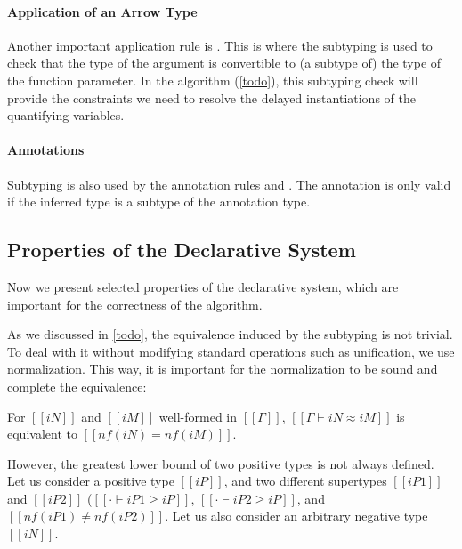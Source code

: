 \paragraph{Application of an Arrow Type}
  Another important application rule is .
  This is where the subtyping is used to check that the type of the argument
  is convertible to (a subtype of) the type of the function parameter.
  In the algorithm (\cref{todo}), this subtyping check will provide the constraints
  we need to resolve the delayed instantiations of the quantifying variables.

\paragraph{Annotations}
  Subtyping is also used by the annotation rules 
  and . The annotation is only valid if the
  inferred type is a subtype of the annotation type.


\subsection{Properties of the Declarative System}

Now we present selected properties of the declarative system,
which are important for the correctness of the algorithm.

As we discussed in \cref{todo}, the equivalence induced by the subtyping is 
not trivial. To deal with it without modifying standard operations such as unification, 
we use normalization. This way, it is important for the normalization to be 
sound and complete \wrt the equivalence:

\begin{property}
  For $[[iN]]$ and $[[iM]]$ well-formed in $[[Γ]]$,
  $[[Γ ⊢ iN ≈ iM]]$ is equivalent to $[[nf(iN) = nf(iM)]]$.
\end{property}

However, the greatest lower bound of two positive types is not always defined.
Let us consider a positive type $[[iP]]$,
and two different supertypes $[[iP1]]$ and $[[iP2]]$
(\ie  $[[· ⊢ iP1 ≥ iP]]$, $[[· ⊢ iP2 ≥ iP]]$, and $[[nf(iP1) ≠ nf(iP2)]]$.
Let us also consider an arbitrary negative type $[[iN]]$.
